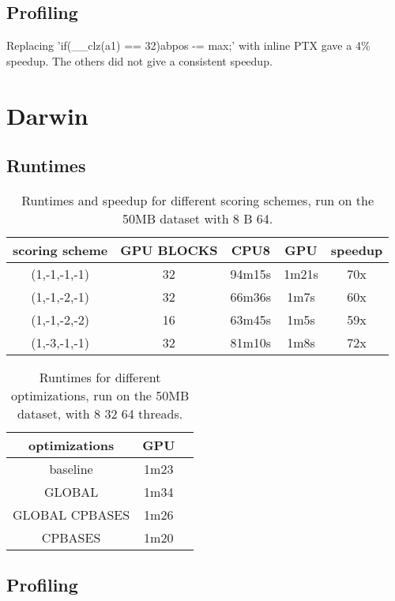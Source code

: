 \documentclass[../main/thesis.tex]{subfiles}
\begin{document}
\subsection{Profiling}


Replacing 'if(__clz(a1) == 32){abpos -= max;}' with inline PTX gave a 4\% speedup.
The others did not give a consistent speedup.



\section{Darwin}
\subsection{Runtimes}


\begin{table}
\centering
\caption{Runtimes and speedup for different scoring schemes, run on the 50MB dataset with 8 B 64.}
\label{tbl:darwin1}
\begin{tabular}{c c c c c}
scoring scheme & GPU BLOCKS & CPU8 & GPU & speedup \\ \hline
(1,-1,-1,-1) & 32 & 94m15s & 1m21s & 70x \\
(1,-1,-2,-1) & 32 & 66m36s & 1m7s  & 60x \\
(1,-1,-2,-2) & 16 & 63m45s & 1m5s  & 59x \\
(1,-3,-1,-1) & 32 & 81m10s & 1m8s  & 72x \\
\end{tabular}
\end{table}

\begin{table}
\centering
\caption{Runtimes for different optimizations, run on the 50MB dataset, with 8 32 64 threads.}
\label{tbl:darwin2}
\begin{tabular}{c c c}
optimizations & GPU \\ \hline
baseline & 1m23 \\
GLOBAL & 1m34 \\
GLOBAL CPBASES & 1m26 \\
CPBASES & 1m20 \\
\end{tabular}
\end{table}

\subsection{Profiling}
\end{document}
